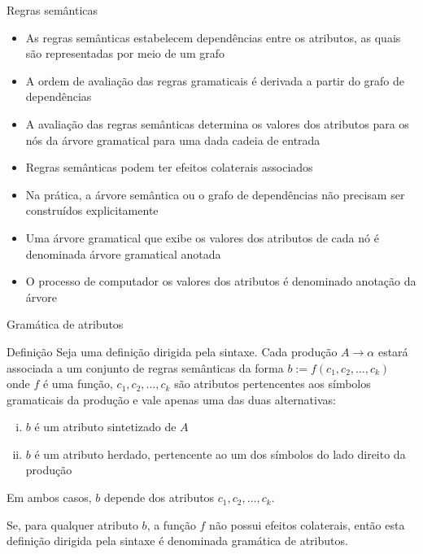\begin{frame}[fragile]{Regras semânticas}

    \begin{itemize}
        \item As regras semânticas estabelecem dependências entre os atributos, as quais são representadas por meio de um grafo
        \pause

        \item A ordem de avaliação das regras gramaticais é derivada a partir do grafo de dependências
        \pause

        \item A avaliação das regras semânticas determina os valores dos atributos para os nós da árvore gramatical para uma dada 
            cadeia de entrada
        \pause

        \item Regras semânticas podem ter efeitos colaterais associados
        \pause

        \item Na prática, a árvore semântica ou o grafo de dependências não precisam ser construídos explicitamente
        \pause

        \item Uma árvore gramatical que exibe os valores dos atributos de cada nó é denominada árvore gramatical anotada
        \pause

        \item O processo de computador os valores dos atributos é denominado anotação da árvore
    \end{itemize}

\end{frame}

\begin{frame}[fragile]{Gramática de atributos}

    \begin{block}{Definição}
        Seja uma definição dirigida pela sintaxe. Cada produção $A\to \alpha$ estará associada a um conjunto de regras semânticas da
        forma $b := f(c_1, c_2, \ldots, c_k)$ onde $f$ é uma função, $c_1, c_2, \ldots, c_k$ são atributos pertencentes aos símbolos
        gramaticais da produção e vale apenas uma das duas alternativas:
        \begin{enumerate}[(i)]
            \item $b$ é um atributo sintetizado de $A$
            \item $b$ é um atributo herdado, pertencente ao um dos símbolos do lado direito da produção
        \end{enumerate}
        Em ambos casos, $b$ depende dos atributos $c_1, c_2, \ldots, c_k$.

        \vspace{0.1in}
        Se, para qualquer atributo $b$, a função $f$ não possui efeitos colaterais, então esta definição dirigida pela sintaxe é 
        denominada gramática de atributos.
    \end{block}

\end{frame}

